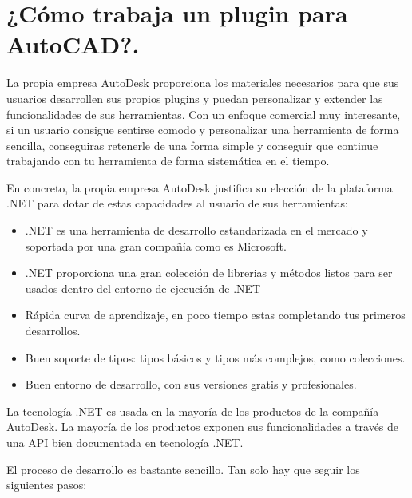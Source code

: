 \section{¿Cómo trabaja un plugin para AutoCAD?.}

La propia empresa AutoDesk proporciona los materiales necesarios para que sus usuarios desarrollen sus propios plugins y puedan personalizar y extender las funcionalidades de sus herramientas. Con un enfoque comercial muy interesante, si un usuario consigue sentirse comodo y personalizar una herramienta de forma sencilla, conseguiras retenerle de una forma simple y conseguir que continue trabajando con tu herramienta de forma sistemática en el tiempo.

En concreto, la propia empresa AutoDesk justifica su elección de la plataforma .NET para dotar de estas capacidades al usuario de sus herramientas:

\begin{itemize}

\item{.NET es una herramienta de desarrollo estandarizada en el mercado y soportada por una gran compañía como es Microsoft.}

\item{.NET proporciona una gran colección de librerias y métodos listos para ser usados dentro del entorno de ejecución de .NET}

\item{Rápida curva de aprendizaje, en poco tiempo estas completando tus primeros desarrollos.}

\item{Buen soporte de tipos: tipos básicos y tipos más complejos, como colecciones.}

\item{Buen entorno de desarrollo, con sus versiones gratis y profesionales.}

\end{itemize}

La tecnología .NET es usada en la mayoría de los productos de la compañía AutoDesk. La mayoría de los productos exponen sus funcionalidades a través de una API bien documentada en tecnología .NET.

El proceso de desarrollo es bastante sencillo. Tan solo hay que seguir los siguientes pasos:

